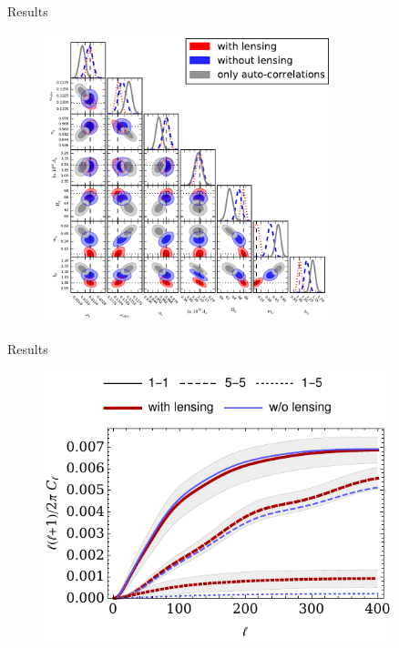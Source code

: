 \documentclass{beamer}
\begin{document}
\begin{frame}{Results}
\begin{figure}[hbtp]
\centering
\includegraphics[width=0.75\textwidth]{../figures/chapter-mnu/triangle_figure_MCDM_bias_cmb_prior.pdf}
\end{figure}

\end{frame}

\begin{frame}{Results}
\begin{figure}[hbtp]
\centering
\includegraphics[width=0.9\textwidth]{../figures/chapter-mnu/fid_shift.pdf}
\end{figure}

\end{frame}
\end{document}

